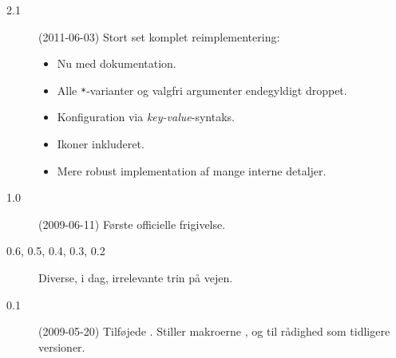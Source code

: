 \documentclass[a4paper,article,oneside,danish]{memoir}
\newcommand{\pakkenavn}[1]{\textsf{#1}}
\begin{document}
\begin{description}
\item[2.1] (2011-06-03) Stort set komplet reimplementering:
  \begin{itemize}
  \item Nu med dokumentation.
  \item Alle \texttt{*}-varianter og valgfri argumenter endegyldigt droppet.
  \item Konfiguration via \textit{key-value}-syntaks.
  \item Ikoner inkluderet.
  \item Mere robust implementation af mange interne detaljer.
  \end{itemize}
\item[1.0] (2009-06-11) Første officielle frigivelse.
\item[0.6, 0.5, 0.4, 0.3, 0.2] Diverse, i dag, irrelevante trin på vejen.
\item[0.1] (2009-05-20) Tilføjede . Stiller
  makroerne ,  og  til rådighed som
  tidligere versioner.
\end{description}
\end{document}
